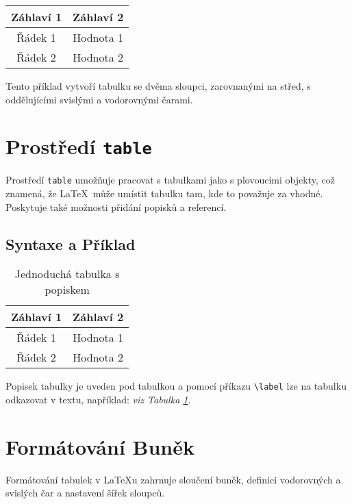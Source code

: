 \begin{center}
\begin{tabular}{|c|c|}
    \hline
    \textbf{Záhlaví 1} & \textbf{Záhlaví 2} \\
    \hline
    Řádek 1 & Hodnota 1 \\
    \hline
    Řádek 2 & Hodnota 2 \\
    \hline
\end{tabular}
\end{center}

Tento příklad vytvoří tabulku se dvěma sloupci, zarovnanými na střed, s oddělujícími svislými a vodorovnými čarami.

\section{Prostředí \texttt{table}}

Prostředí \texttt{table} umožňuje pracovat s tabulkami jako s plovoucími objekty, což znamená, že \LaTeX\ může umístit tabulku tam, kde to považuje za vhodné. Poskytuje také možnosti přidání popisků a referencí.

\subsection{Syntaxe a Příklad}

\begin{table}[h!]
    \centering
    \begin{tabular}{|c|c|}
        \hline
        \textbf{Záhlaví 1} & \textbf{Záhlaví 2} \\
        \hline
        Řádek 1 & Hodnota 1 \\
        \hline
        Řádek 2 & Hodnota 2 \\
        \hline
    \end{tabular}
    \caption{Jednoduchá tabulka s popiskem}
    \label{tab:simple_example}
\end{table}

Popisek tabulky je uveden pod tabulkou a pomocí příkazu \texttt{\textbackslash label} lze na tabulku odkazovat v textu, například: \textit{viz Tabulka \ref{tab:simple_example}}.

\section{Formátování Buněk}

Formátování tabulek v \LaTeX u zahrnuje sloučení buněk, definici vodorovných a svislých čar a nastavení šířek sloupců.

